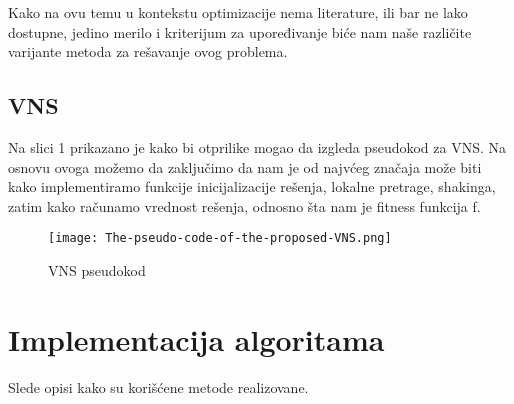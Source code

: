 \documentclass{article}
\begin{document}
Kako na ovu temu u kontekstu optimizacije nema literature, ili bar ne lako dostupne, jedino merilo i kriterijum za upoređivanje biće nam naše različite varijante metoda za rešavanje ovog problema.

\subsection{\huge VNS}\label{sec:vns}
Na slici 1 prikazano je kako bi otprilike mogao da izgleda pseudokod za VNS. Na osnovu ovoga možemo da zaključimo da nam je od najvćeg značaja može biti kako implementiramo funkcije inicijalizacije rešenja, lokalne pretrage, shakinga, zatim kako računamo vrednost rešenja, odnosno šta nam je fitness funkcija f.


\begin{figure}[h]
  \centering
  \texttt{[image: The-pseudo-code-of-the-proposed-VNS.png]}
  \caption{VNS pseudokod}
  \label{fig:example}
\end{figure}

\newpage
\section{\huge Implementacija algoritama}\label{sec:impl}
Slede opisi kako su korišćene metode realizovane.
\end{document}
